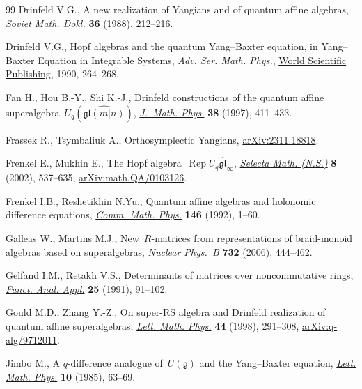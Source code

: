 \documentclass[pdftex]{sigma}
\numberwithin{equation}{section}
\begin{document}
\begin{thebibliography}{99}
Drinfeld V.G., A new realization of {Y}angians and of quantum affine algebras,
 \textit{Soviet Math. Dokl.} \textbf{36} (1988), 212--216.

Drinfeld V.G., Hopf algebras and the quantum {Y}ang--{B}axter equation, in
 Yang--{B}axter {E}quation in {I}ntegrable {S}ystems, \textit{Adv. Ser. Math. Phys.},
 \href{https://doi.org/10.1142/9789812798336_0013}{World Scientific Publishing}, 1990, 264--268.

Fan H., Hou B.-Y., Shi K.-J., Drinfeld constructions of the quantum affine
 superalgebra~{$U_q(\widehat {\mathfrak{gl}(m|n)})$}, \href{https://doi.org/10.1063/1.532188}{\textit{J.~Math. Phys.}}
 \textbf{38} (1997), 411--433.

Frassek R., Tsymbaliuk A., Orthosymplectic {Y}angians, \href{https://arxiv.org/abs/2311.18818}{arXiv:2311.18818}.

Frenkel E., Mukhin E., The {H}opf algebra~{$\operatorname{Rep} U_q\widehat{\mathfrak{gl}}_\infty$}, \href{https://doi.org/10.1007/PL00012603}{\textit{Selecta Math. (N.S.)}}
 \textbf{8} (2002), 537--635, \href{https://arxiv.org/abs/math.QA/0103126}{arXiv:math.QA/0103126}.

Frenkel I.B., Reshetikhin N.Yu., Quantum affine algebras and holonomic
 difference equations, \href{https://doi.org/10.1007/bf02099206}{\textit{Comm. Math. Phys.}} \textbf{146} (1992), 1--60.

Galleas W., Martins M.J., New~{$R$}-matrices from representations of
 braid-monoid algebras based on superalgebras, \href{https://doi.org/10.1016/j.nuclphysb.2005.10.025}{\textit{Nuclear Phys.~B}}
 \textbf{732} (2006), 444--462.

Gelfand I.M., Retakh V.S., Determinants of matrices over noncommutative rings,
 \href{https://doi.org/10.1007/BF01079588}{\textit{Funct. Anal. Appl.}} \textbf{25} (1991), 91--102.

Gould M.D., Zhang Y.-Z., On super-{RS} algebra and {D}rinfeld realization of
 quantum affine superalgebras, \href{https://doi.org/10.1023/A:1007494602290}{\textit{Lett. Math. Phys.}} \textbf{44} (1998),
 291--308, \href{https://arxiv.org/abs/q-alg/9712011}{arXiv:q-alg/9712011}.

Jimbo M., A {$q$}-difference analogue of~{$U(\mathfrak{g})$} and the
 {Y}ang--{B}axter equation, \href{https://doi.org/10.1007/BF00704588}{\textit{Lett. Math. Phys.}} \textbf{10} (1985),
 63--69.


\end{thebibliography}
\end{document}
